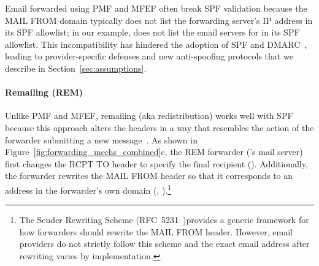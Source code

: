 Email forwarded using PMF and MFEF often break SPF validation because the \textsc{MAIL FROM} domain typically does not list the forwarding server's IP address in its SPF allowlist;
in our example,  does not list the email servers for  in its SPF allowlist.
This incompatibility has hindered the adoption of SPF and DMARC~\cite{hutowardsunderstanding},
leading to provider-specific defenses and new anti-spoofing protocols that we describe in Section~\ref{sec:assumptions}.




\paragraph{Remailing (REM)}
Unlike PMF and MFEF, remailing (aka redistribution)
works well with SPF because this approach alters the headers in a way that resembles the action of the forwarder submitting a new message~\cite{SenderRe69:online}.
As shown in Figure~\ref{fig:forwarding_mechs_combined}c, the REM
forwarder ('s mail server) first changes the
\textsc{RCPT TO} header to specify the final recipient ().
Additionally, the forwarder rewrites the \textsc{MAIL FROM} header so that it
corresponds to an address in the forwarder's own domain (\eg,
).\footnote{The Sender Rewriting Scheme
(RFC~5231~\cite{rfc5231})provides a generic framework for how forwarders should
rewrite the \textsc{MAIL FROM} header.  However, email providers do not
strictly follow this scheme and the exact email address after rewriting varies
by implementation.}

